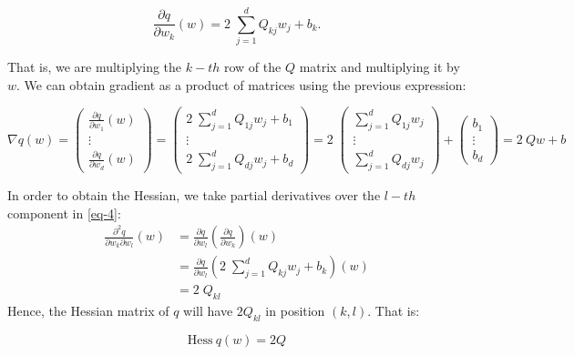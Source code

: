 \documentclass[11pt,table]{article}
\begin{document}
\begin{equation}
  \label{eq-4}
  \frac{\partial q}{\partial w_k} (w) = 2 \; \sum_{j=1}^{d} Q_{kj} w_{j} + b_{k}.
\end{equation}

That is, we are multiplying the \(k-th\) row of the \(Q\) matrix and multiplying it by \(w\). We can obtain gradient as a product of matrices using the previous expression:

\[
  \nabla q(w) = \begin{pmatrix}
    \frac{\partial q}{\partial w_1} (w) \\
    \vdots                              \\
    \frac{\partial q}{\partial w_d} (w)
  \end{pmatrix}
  = \begin{pmatrix}
    2 \; \sum_{j=1}^{d} Q_{1j} w_{j} + b_{1} \\
    \vdots                                   \\
    2 \; \sum_{j=1}^{d} Q_{dj} w_{j} + b_{d}
  \end{pmatrix}
  = 2 \; \begin{pmatrix}
    \sum_{j=1}^{d} Q_{1j} w_{j} \\
    \vdots                      \\
    \sum_{j=1}^{d} Q_{dj} w_{j}
  \end{pmatrix} + \begin{pmatrix}
    b_{1}  \\
    \vdots \\
    b_{d}
  \end{pmatrix}
  = 2 \ Qw + b
\]

In order to obtain the Hessian, we take partial derivatives over the \(l-th\) component in \ref{eq-4}:
\begin{align*}
  \frac{\partial^2 q}{\partial w_k \partial w_l} (w) & = \frac{\partial q}{\partial w_l} \left( \frac{\partial q}{\partial w_k} \right) (w)          \\
                                                     & = \frac{\partial q}{\partial w_l} \left( 2 \; \sum_{j=1}^{d} Q_{kj} w_{j} + b_{k} \right) (w) \\
                                                     & = 2 \; Q_{kl}
\end{align*}
Hence, the Hessian matrix of \(q\) will have \(2 Q_{kl}\) in position \((k, l)\). That is:

\[
  \text{Hess} \ q(w) = 2Q
\]
\end{document}
